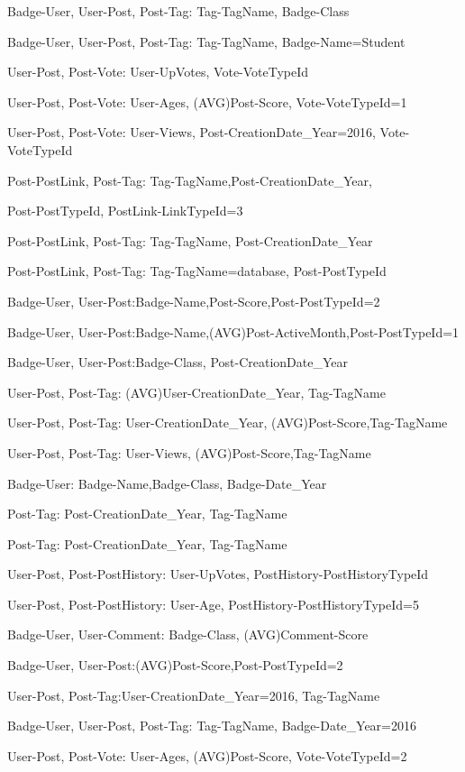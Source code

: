 Badge-User, User-Post, Post-Tag: Tag-TagName, Badge-Class

Badge-User, User-Post, Post-Tag: Tag-TagName, Badge-Name=Student

User-Post, Post-Vote: User-UpVotes, Vote-VoteTypeId

User-Post, Post-Vote: User-Ages, (AVG)Post-Score, Vote-VoteTypeId=1

User-Post, Post-Vote: User-Views, Post-CreationDate\_Year=2016, Vote-VoteTypeId

Post-PostLink, Post-Tag: Tag-TagName,Post-CreationDate\_Year, 

Post-PostTypeId, PostLink-LinkTypeId=3

Post-PostLink, Post-Tag: Tag-TagName, Post-CreationDate\_Year

Post-PostLink, Post-Tag: Tag-TagName=database, Post-PostTypeId

Badge-User, User-Post:Badge-Name,Post-Score,Post-PostTypeId=2

Badge-User, User-Post:Badge-Name,(AVG)Post-ActiveMonth,Post-PostTypeId=1

Badge-User, User-Post:Badge-Class, Post-CreationDate\_Year

User-Post, Post-Tag: (AVG)User-CreationDate\_Year, Tag-TagName

User-Post, Post-Tag: User-CreationDate\_Year, (AVG)Post-Score,Tag-TagName

User-Post, Post-Tag: User-Views, (AVG)Post-Score,Tag-TagName

Badge-User: Badge-Name,Badge-Class, Badge-Date\_Year

Post-Tag: Post-CreationDate\_Year, Tag-TagName

Post-Tag: Post-CreationDate\_Year, Tag-TagName

User-Post, Post-PostHistory: User-UpVotes, PostHistory-PostHistoryTypeId

User-Post, Post-PostHistory: User-Age, PostHistory-PostHistoryTypeId=5

Badge-User, User-Comment: Badge-Class, (AVG)Comment-Score



Badge-User, User-Post:(AVG)Post-Score,Post-PostTypeId=2

User-Post, Post-Tag:User-CreationDate\_Year=2016, Tag-TagName

Badge-User, User-Post, Post-Tag: Tag-TagName, Badge-Date\_Year=2016

User-Post, Post-Vote: User-Ages, (AVG)Post-Score, Vote-VoteTypeId=2

